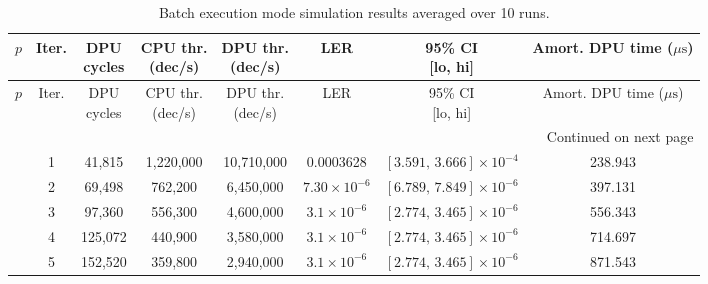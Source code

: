 \begingroup
\small
\setlength{\tabcolsep}{4pt}
\renewcommand{\arraystretch}{1.15}

\begin{longtable}{c|c|c|c|c|c|c|c}
\caption{Batch execution mode simulation results averaged over 10 runs.}
\label{tab:full_results}\\
\hline
\(p\) & Iter. & \makecell[c]{DPU\\cycles}
& \makecell[c]{CPU thr.\\(dec/s)}
& \makecell[c]{DPU thr.\\(dec/s)}
& LER
& \makecell[c]{95\% CI\\{[lo, hi]}}
& \makecell[c]{Amort. DPU time\\(\(\mu\mathrm{s}\))}
\\
\hline
\endfirsthead

\hline
\(p\) & Iter. & \makecell[c]{DPU\\cycles}
& \makecell[c]{CPU thr.\\(dec/s)}
& \makecell[c]{DPU thr.\\(dec/s)}
& LER
& \makecell[c]{95\% CI\\{[lo, hi]}}
& \makecell[c]{Amort. DPU time\\(\(\mu\mathrm{s}\))}
\\
\hline
\endhead

\hline
\multicolumn{8}{r}{Continued on next page} \\
\hline
\endfoot

\hline
\endlastfoot

\multirow{10}{*}{0.001}
& 1 & 41,815 & 1,220,000 & 10,710,000
& 0.0003628
& \(\left[3.591,\,3.666\right]\times10^{-4}\)
& 238.943 \\ \cline{2-8}

& 2 & 69,498 & 762,200 & 6,450,000
& \(7.30\times10^{-6}\)
& \(\left[6.789,\,7.849\right]\times10^{-6}\)
& 397.131 \\ \cline{2-8}

& 3 & 97,360 & 556,300 & 4,600,000
& \(3.1\times10^{-6}\)
& \(\left[2.774,\,3.465\right]\times10^{-6}\)
& 556.343 \\ \cline{2-8}

& 4 & 125,072 & 440,900 & 3,580,000
& \(3.1\times10^{-6}\)
& \(\left[2.774,\,3.465\right]\times10^{-6}\)
& 714.697 \\ \cline{2-8}

& 5 & 152,520 & 359,800 & 2,940,000
& \(3.1\times10^{-6}\)
& \(\left[2.774,\,3.465\right]\times10^{-6}\)
& 871.543 \\ \cline{2-8}


\end{longtable}
